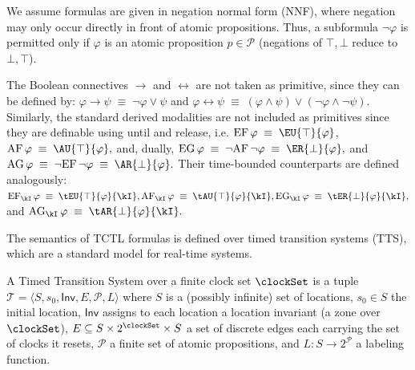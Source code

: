 We assume formulas are given in {negation normal form} (NNF), where negation may only occur directly in front of atomic propositions. Thus, a subformula $\neg \varphi$ is permitted only if $\varphi$ is an atomic proposition $p \in \mathcal{P}$ (negations of $\top,\bot$ reduce to $\bot,\top$).

The Boolean connectives $\rightarrow$ and $\leftrightarrow$ are not taken as primitive, since they can be defined by:
$ \varphi \rightarrow \psi \;\equiv\; \neg \varphi \lor \psi$ and $\varphi \leftrightarrow \psi \;\equiv\;
(\varphi \land \psi) \lor (\neg \varphi \land \neg \psi).$ Similarly, the standard derived modalities are not included as primitives since they are definable using until and release, i.e. $\mathrm{EF}\,\varphi \;\equiv\; \EU{\top}{\varphi}$, $\mathrm{AF}\,\varphi \;\equiv\; \AU{\top}{\varphi}, $ and, dually,
$\mathrm{EG}\,\varphi \;\equiv\; \neg \mathrm{AF}\,\neg\varphi
\;\equiv\; \ER{\bot}{\varphi}, $ and $
\mathrm{AG}\,\varphi \;\equiv\; \neg \mathrm{EF}\,\neg\varphi
\;\equiv\; \AR{\bot}{\varphi}.$
Their time-bounded counterparts are defined analogously: $\mathrm{EF}_{\kI}\,\varphi \;\equiv\; \tEU{\top}{\varphi}{\kI},
\mathrm{AF}_{\kI}\,\varphi \;\equiv\; \tAU{\top}{\varphi}{\kI}, 
\mathrm{EG}_{\kI}\,\varphi \;\equiv\;
\tER{\bot}{\varphi}{\kI},$ and $
\mathrm{AG}_{\kI}\,\varphi \;\equiv\;
\tAR{\bot}{\varphi}{\kI}.
$




The semantics of TCTL formulas is defined over timed transition systems (TTS), which are a standard model for real-time systems.

\begin{definition}\label{def:tts}
A {Timed Transition System} over a finite clock set $\clockSet$ is a tuple $\mathcal{T}
=
\langle S, s_0, \mathsf{Inv}, E, \mathcal{P}, L \rangle
$ where $S$ is a (possibly infinite) set of {locations}, $s_0 \in S$ the initial location, $\mathsf{Inv}$ assigns to each location a {location invariant} (a zone over $\clockSet$), $E \subseteq S \times 2^{\clockSet} \times S$ a set of {discrete edges} each carrying the set of clocks it resets, $\mathcal{P}$ a finite set of atomic propositions, and $L : S \to 2^{\mathcal{P}}$ a labeling function.
\end{definition}

